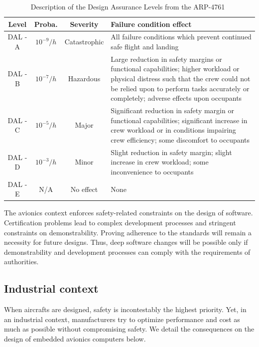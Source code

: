 \documentclass[main.tex]{subfiles}
\begin{document}
\begin{table}
    \centering  
    {
    \small
    \begin{tabularx}{\textwidth}{cccX}
	\hline
        {\sc \textbf{Level}} 	& {\sc \textbf{Proba.}} & {\sc \textbf{Severity}} & {\sc \textbf{Failure condition effect}}	\\
	    \hline
        DAL - A & $10^{-9}/h$ & Catastrophic & All failure conditions which
        prevent continued safe flight and landing \\
        
        \hline
        DAL - B & $10^{-7}/h$ & Hazardous    & Large reduction in safety
        margins or functional capabilities; higher workload or physical
        distress such that the crew could not be relied upon to perform tasks
        accurately or completely; adverse effects upon occupants\\

        \hline
        DAL - C & $10^{-5}/h$ & Major        & Significant reduction in safety
        margin or functional capabilities; significant increase in crew
        workload or in conditions impairing crew efficiency; some discomfort to
        occupants\\

        \hline
        DAL - D & $10^{-3}/h$ & Minor        & Slight reduction in safety
        margin; slight increase in crew workload; some inconvenience to
        occupants \\

        \hline
        DAL - E &   N/A       & No effect    & None \\
        \hline	
\end{tabularx}
    }
    \caption{Description of the Design Assurance Levels from the
    ARP-4761~\cite{arp4761}}
    \label{tab_intro_DALs}
\end{table}

The avionics context enforces safety-related constraints on the design of
software. Certification problems lead to complex development processes and
stringent constraints on demonstrability. Proving adherence to the standards
will remain a necessity for future designs. Thus, deep software changes will be
possible only if demonstrability and development processes can comply with the
requirements of authorities.


\subsection{Industrial context} When aircrafts are designed, safety is
incontestably the highest priority. Yet, in an industrial context,
manufacturers try to optimize performance and cost as much as possible without
compromising safety. We detail the consequences on the design of embedded
avionics computers below.
\end{document}
